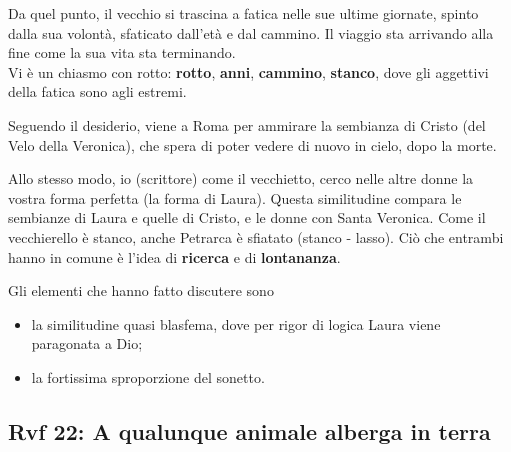 \documentclass[a4paper]{article}
\begin{document}
Da quel punto, il vecchio si trascina a fatica nelle sue ultime giornate,
spinto dalla sua volontà, sfaticato dall'età e dal cammino.
Il viaggio sta arrivando alla fine come la sua vita sta terminando.\\
Vi è un chiasmo con rotto: \textbf{rotto}, \textbf{anni}, \textbf{cammino}, \textbf{stanco},
dove gli aggettivi della fatica sono agli estremi.

Seguendo il desiderio, viene a Roma per ammirare la sembianza di Cristo (del Velo della Veronica),
che spera di poter vedere di nuovo in cielo, dopo la morte.


Allo stesso modo, io (scrittore) come il vecchietto, cerco nelle altre donne la vostra forma perfetta
(la forma di Laura).
Questa similitudine compara le sembianze di Laura e quelle di Cristo, e le donne con Santa Veronica.
Come il vecchierello è stanco, anche Petrarca è sfiatato (stanco - lasso).
Ciò che entrambi hanno in comune è l'idea di \textbf{ricerca} e di \textbf{lontananza}.

Gli elementi che hanno fatto discutere sono
\begin{itemize}
    \item la similitudine quasi blasfema, dove per rigor di logica Laura viene paragonata a Dio;
    \item la fortissima sproporzione del sonetto.
\end{itemize}


\pagebreak

\subsection{Rvf 22: A qualunque animale alberga in terra}
\end{document}
